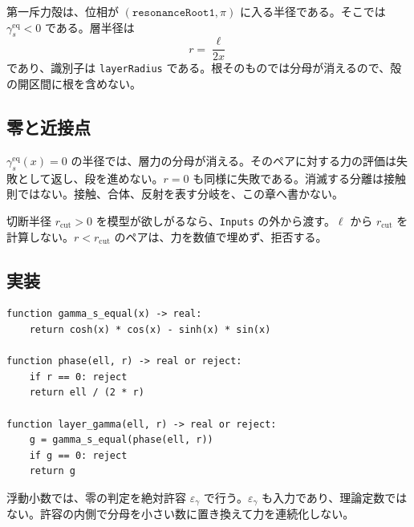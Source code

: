 第一斥力殻は、位相が \((\texttt{resonanceRoot1},\pi)\) に入る半径である。そこでは \(\gamma_s^{\mathrm{eq}}<0\) である。層半径は
\[
r=\frac{\ell}{2x}
\]
であり、識別子は \texttt{layerRadius} である。根そのものでは分母が消えるので、殻の開区間に根を含めない。

\subsection{零と近接点}

\(\gamma_s^{\mathrm{eq}}(x)=0\) の半径では、層力の分母が消える。そのペアに対する力の評価は失敗として返し、段を進めない。\(r=0\) も同様に失敗である。消滅する分離は接触則ではない。接触、合体、反射を表す分岐を、この章へ書かない。

切断半径 \(r_{\mathrm{cut}}>0\) を模型が欲しがるなら、\texttt{Inputs} の外から渡す。\(\ell\) から \(r_{\mathrm{cut}}\) を計算しない。\(r<r_{\mathrm{cut}}\) のペアは、力を数値で埋めず、拒否する。

\subsection{実装}

\begin{verbatim}
function gamma_s_equal(x) -> real:
    return cosh(x) * cos(x) - sinh(x) * sin(x)

function phase(ell, r) -> real or reject:
    if r == 0: reject
    return ell / (2 * r)

function layer_gamma(ell, r) -> real or reject:
    g = gamma_s_equal(phase(ell, r))
    if g == 0: reject
    return g
\end{verbatim}

浮動小数では、零の判定を絶対許容 \(\varepsilon_\gamma\) で行う。\(\varepsilon_\gamma\) も入力であり、理論定数ではない。許容の内側で分母を小さい数に置き換えて力を連続化しない。
